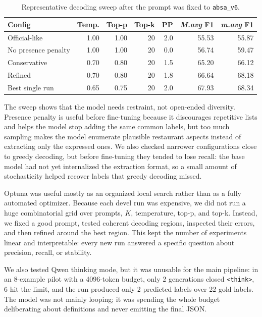 \documentclass[11pt,a4paper]{article}
\newcommand{\mavg}{\textit{m.avg}}
\newcommand{\Mavg}{\textit{M.avg}}
\newcommand{\code}[1]{\texttt{#1}}
\begin{document}
\begin{table}[H]
    \centering
    \small
    \setlength{\tabcolsep}{4pt}
    \caption{Representative decoding sweep after the prompt was fixed to \code{absa\_v6}.}
    \label{tab:decoding}
    \begin{tabular}{@{}lrrrrrr@{}}
        \toprule
        Config & Temp. & Top-p & Top-k & PP & \Mavg{} F1 & \mavg{} F1 \\
        \midrule
        Official-like & 1.00 & 1.00 & 20 & 2.0 & 55.53 & 55.87 \\
        No presence penalty & 1.00 & 1.00 & 20 & 0.0 & 56.74 & 59.47 \\
        Conservative & 0.70 & 0.80 & 20 & 1.5 & 65.20 & 66.12 \\
        Refined & 0.70 & 0.80 & 20 & 1.8 & 66.64 & 68.18 \\
        Best single run & 0.65 & 0.75 & 20 & 2.0 & 67.93 & 68.34 \\
        \bottomrule
    \end{tabular}
\end{table}

The sweep shows that the model needs restraint, not open-ended diversity. Presence penalty is useful before fine-tuning because it discourages repetitive lists and helps the model stop adding the same common labels, but too much sampling makes the model enumerate plausible restaurant aspects instead of extracting only the expressed ones. We also checked narrower configurations close to greedy decoding, but before fine-tuning they tended to lose recall: the base model had not yet internalized the extraction format, so a small amount of stochasticity helped recover labels that greedy decoding missed.

Optuna was useful mostly as an organized local search rather than as a fully automated optimizer. Because each devel run was expensive, we did not run a huge combinatorial grid over prompts, $K$, temperature, top-p, and top-k. Instead, we fixed a good prompt, tested coherent decoding regions, inspected their errors, and then refined around the best region. This kept the number of experiments linear and interpretable: every new run answered a specific question about precision, recall, or stability.

We also tested Qwen thinking mode, but it was unusable for the main pipeline: in an 8-example pilot with a 4096-token budget, only 2 generations closed \code{<think>}, 6 hit the limit, and the run produced only 2 predicted labels over 22 gold labels. The model was not mainly looping; it was spending the whole budget deliberating about definitions and never emitting the final JSON.
\end{document}
